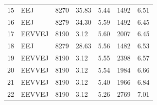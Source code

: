 \documentclass[letterpaper, preprint, paper,11pt]{AAS}	%
\begin{document}
\begin{table}[h!]
\begin{tabular}{lllllll}
        15                          & EEJ                        & 8270                            & 35.83                                                  & 5.44                                                    & 1492                       & 6.51                                                             \\
        16                          & EEJ                        & 8279                            & 34.30                                                  & 5.59                                                    & 1492                       & 6.45                                                             \\
        17                          & EEVVEJ                     & 8190                            & 3.12                                                   & 5.60                                                    & 2007                       & 6.45                                                             \\
        18                          & EEJ                        & 8279                            & 28.63                                                  & 5.56                                                    & 1482                       & 6.53                                                             \\
        19                          & EEVVEJ                     & 8190                            & 3.12                                                   & 5.55                                                    & 2398                       & 6.57                                                             \\
        20                          & EEVVEJ                     & 8190                            & 3.12                                                   & 5.54                                                    & 1984                       & 6.66                                                             \\
        21                          & EEVVEJ                     & 8190                            & 3.12                                                   & 5.40                                                    & 1966                       & 6.84                                                             \\
        22                          & EEVVEJ                     & 8190                            & 3.12                                                    & 5.26                                                    & 2769                       & 7.01                                                             \\
        \bottomrule
    \end{tabular}
\end{table}
\end{document}
